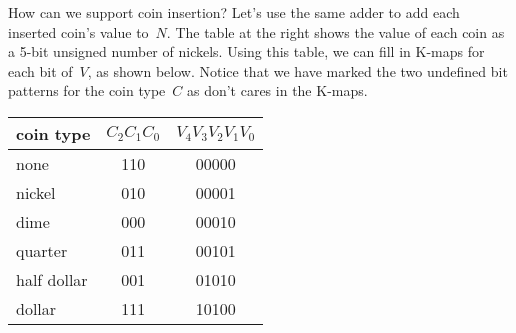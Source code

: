 \begin{minipage}{3.9in}
How can we support coin insertion?  Let's use the same adder to add
each inserted coin's value to~$N$.  The table at the right shows
the value of each coin as a \mbox{5-bit} unsigned number of nickels.
Using this table, we can fill in \mbox{K-maps} for each bit of~$V$, as
shown below.  Notice that we have marked the two undefined bit patterns
for the coin type~$C$ as don't cares in the \mbox{K-maps}.
\end{minipage}\hspace{0.25in}%
\begin{minipage}{2.35in}
\begin{tabular}{l|c|c}
\multicolumn{1}{c|}{coin type}& $C_2C_1C_0$& $V_4V_3V_2V_1V_0$\\ \hline
none&        110& 00000\\
nickel&      010& 00001\\
dime&        000& 00010\\
quarter&     011& 00101\\
half dollar& 001& 01010\\
dollar&      111& 10100
\end{tabular}\vspace{12pt}
\end{minipage}

\begin{minipage}{1.00in}
\end{minipage}\hspace{0.25in}\begin{minipage}{1.00in}
\end{minipage}\hspace{0.25in}\begin{minipage}{1.00in}
\end{minipage}\hspace{0.25in}\begin{minipage}{1.00in}
\end{minipage}\hspace{0.25in}\begin{minipage}{1.00in}
\end{minipage}


